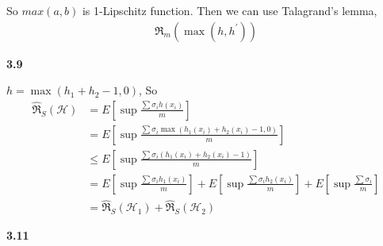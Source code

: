 \documentclass[12pt]{article}
\begin{document}
\begin{enumerate}[label=(\alph*), left=0pt]
    So $max(a, b)$ is 1-Lipschitz function. Then we can use Talagrand's lemma, 
    \begin{align*}
        \mathfrak{R}_{m}({\max(h, h^{'})})
    \end{align*}
\end{enumerate}

\vspace{1em}  %

\noindent \textbf{3.9}

$ h = \max(h_{1} + h_{2} - 1, 0)$, So 
\begin{align*}
    \hat{\mathfrak{R}}_{S}(\mathcal{H})
    &= E[\sup \frac{\sum \sigma_{i} h(x_{i})}{m}] \\
    &= E[\sup \frac{\sum \sigma_{i} \max(h_{1}(x_{i}) + h_{2}(x_{i}) - 1, 0)}{m}] \\
    &\le E[\sup \frac{\sum \sigma_{i} (h_{1}(x_{i}) + h_{2}(x_{i}) - 1)}{m}] \\ 
    &= E[\sup \frac{\sum \sigma_{i} h_{1}(x_{i})}{m}] + E[\sup \frac{\sum \sigma_{i} h_{2}(x_{i})}{m}] + 
        E[\sup \frac{\sum \sigma_{i}}{m}] \\
    &= \hat{\mathfrak{R}}_{S}(\mathcal{H}_{1}) + \hat{\mathfrak{R}}_{S}(\mathcal{H}_{2})
\end{align*}

\vspace{1em}  %

\noindent \textbf{3.11}
\end{document}

